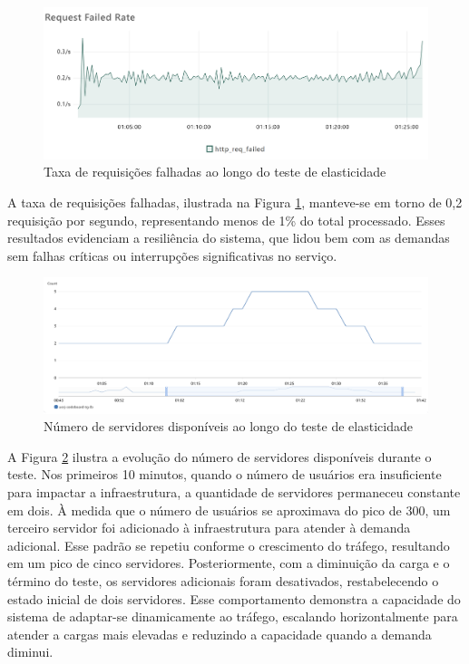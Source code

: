 \begin{figure}[H]
    \centering
    \includegraphics[width=1\textwidth]{assets/elasticity-test/req-failed-rate.png}
    \caption{Taxa de requisições falhadas ao longo do teste de elasticidade}
    \label{fig:elasticity-req-failed-rate}
\end{figure}

A taxa de requisições falhadas, ilustrada na Figura \ref{fig:elasticity-req-failed-rate}, manteve-se em torno de 0,2 requisição por segundo, representando menos de 1\% do total processado. Esses resultados evidenciam a resiliência do sistema, que lidou bem com as demandas sem falhas críticas ou interrupções significativas no serviço.

\begin{figure}[H]
    \centering
    \includegraphics[width=1\textwidth]{assets/elasticity-test/healthy-hosts.png}
    \caption{Número de servidores disponíveis ao longo do teste de elasticidade}
    \label{fig:elasticity-healthy-hosts}
\end{figure}

A Figura \ref{fig:elasticity-healthy-hosts} ilustra a evolução do número de servidores disponíveis durante o teste. Nos primeiros 10 minutos, quando o número de usuários era insuficiente para impactar a infraestrutura, a quantidade de servidores permaneceu constante em dois. À medida que o número de usuários se aproximava do pico de 300, um terceiro servidor foi adicionado à infraestrutura para atender à demanda adicional. Esse padrão se repetiu conforme o crescimento do tráfego, resultando em um pico de cinco servidores. Posteriormente, com a diminuição da carga e o término do teste, os servidores adicionais foram desativados, restabelecendo o estado inicial de dois servidores. Esse comportamento demonstra a capacidade do sistema de adaptar-se dinamicamente ao tráfego, escalando horizontalmente para atender a cargas mais elevadas e reduzindo a capacidade quando a demanda diminui.

